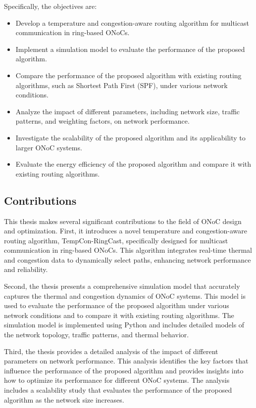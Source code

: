 \documentclass[12pt]{article}
\begin{document}
Specifically, the objectives are:
\begin{itemize}
    \item Develop a temperature and congestion-aware routing algorithm for multicast communication in ring-based ONoCs.
    \item Implement a simulation model to evaluate the performance of the proposed algorithm.
    \item Compare the performance of the proposed algorithm with existing routing algorithms, such as Shortest Path First (SPF), under various network conditions.
    \item Analyze the impact of different parameters, including network size, traffic patterns, and weighting factors, on network performance.
    \item Investigate the scalability of the proposed algorithm and its applicability to larger ONoC systems.
    \item Evaluate the energy efficiency of the proposed algorithm and compare it with existing routing algorithms.
\end{itemize}

\subsection{Contributions}
This thesis makes several significant contributions to the field of ONoC design and optimization. First, it introduces a novel temperature and congestion-aware routing algorithm, TempCon-RingCast, specifically designed for multicast communication in ring-based ONoCs. This algorithm integrates real-time thermal and congestion data to dynamically select paths, enhancing network performance and reliability.

Second, the thesis presents a comprehensive simulation model that accurately captures the thermal and congestion dynamics of ONoC systems. This model is used to evaluate the performance of the proposed algorithm under various network conditions and to compare it with existing routing algorithms. The simulation model is implemented using Python and includes detailed models of the network topology, traffic patterns, and thermal behavior.

Third, the thesis provides a detailed analysis of the impact of different parameters on network performance. This analysis identifies the key factors that influence the performance of the proposed algorithm and provides insights into how to optimize its performance for different ONoC systems. The analysis includes a scalability study that evaluates the performance of the proposed algorithm as the network size increases.
\end{document}
